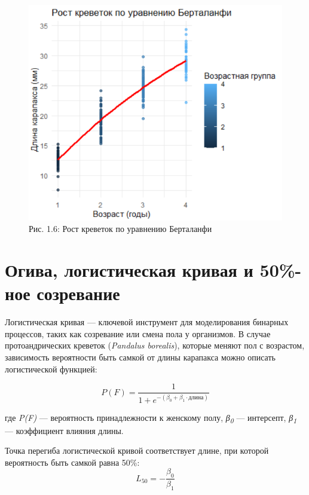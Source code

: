 \documentclass[
  letterpaper,
  DIV=11,
  numbers=noendperiod]{scrreprt}
\begin{document}
\begin{figure}[H]

{\centering \includegraphics[width=0.6\linewidth,height=\textheight,keepaspectratio]{images/bertalanffy_model.PNG}

}

\caption{Рис. 1.6: Рост креветок по уравнению Берталанфи}

\end{figure}%

\section{Огива, логистическая кривая и 50\%-ное
созревание}\label{ux43eux433ux438ux432ux430-ux43bux43eux433ux438ux441ux442ux438ux447ux435ux441ux43aux430ux44f-ux43aux440ux438ux432ux430ux44f-ux438-50-ux43dux43eux435-ux441ux43eux437ux440ux435ux432ux430ux43dux438ux435}

Логистическая кривая --- ключевой инструмент для моделирования бинарных
процессов, таких как созревание или смена пола у организмов. В случае
протоандрических креветок (\emph{Pandalus borealis}), которые меняют пол
с возрастом, зависимость вероятности быть самкой от длины карапакса
можно описать логистической функцией:

\[
P(F) = \frac{1}{1 + e^{-(\beta_0 + \beta_1 \cdot длина)}}
\]

где \emph{P(F)} --- вероятность принадлежности к женскому полу,
\emph{β\textsubscript{0}} --- интерсепт, \emph{β\textsubscript{1}} ---
коэффициент влияния длины.

Точка перегиба логистической кривой соответствует длине, при которой
вероятность быть самкой равна 50\%: \[
L_{50} = -\frac{\beta_0}{\beta_1}
\]
\end{document}
